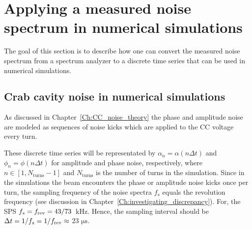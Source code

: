
\section{Applying a measured noise spectrum in numerical simulations}\label{sec:measured_spectra_to_time_series}

The goal of this section is to describe how one can convert the measured noise spectrum from a spectrum analyzer to a discrete time series that can be used in numerical simulations. 



\subsection{Crab cavity noise in numerical simulations}
As discussed in Chapter~\ref{Ch:CC_noise_theory} the phase and amplitude noise are modeled as sequences of noise kicks which are applied to the CC voltage every turn.

These discrete time series will be representated by $\alpha_n = \alpha(n\Delta t)$ and  $\phi_n = \phi(n\Delta t)$ for amplitude and phase noise, respectively, where  $n \in \left [1, N_\mathrm{turns}-1 \right ]$ and $N_\mathrm{turns}$ is the number of turns in the simulation. Since in the simulations the beam encounters the phase or amplitude noise kicks once per turn, the sampling frequency of the noise spectra $f_s$ equals the revolution frequency (see discussion in Chapter~\ref{Ch:investigating_discrepancy}). For, the SPS $f_s={f_\mathrm{rev}}=43/73$ \,kHz. Hence, the sampling interval should be $\Delta t=1/f_s = 1/{f_\mathrm{rev}} \approx$ 23 $\mathrm{\mu s}$.  



